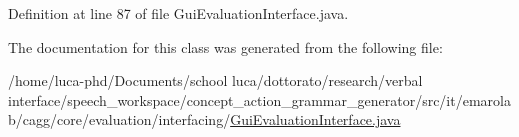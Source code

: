 Definition at line 87 of file Gui\-Evaluation\-Interface.\-java.



The documentation for this class was generated from the following file\-:\begin{DoxyCompactItemize}
\item 
/home/luca-\/phd/\-Documents/school luca/dottorato/research/verbal interface/speech\-\_\-workspace/concept\-\_\-action\-\_\-grammar\-\_\-generator/src/it/emarolab/cagg/core/evaluation/interfacing/\hyperlink{GuiEvaluationInterface_8java}{Gui\-Evaluation\-Interface.\-java}\end{DoxyCompactItemize}
